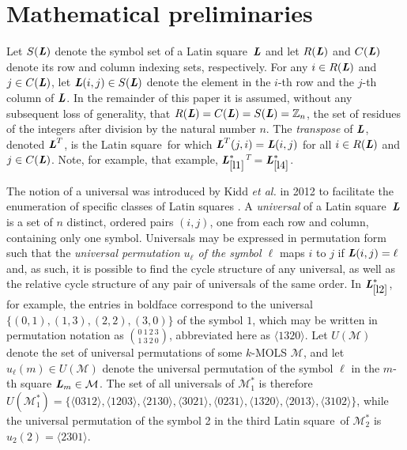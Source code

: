 \documentclass[11pt, a4paper]{article}
\newcommand{\lat}{Latin square}
\renewcommand{\l}{ \mbox{\bf \emph{L}} }
\newcommand{\m}{\mathcal{ M}}
\newcommand{\lref}[1]{$\l_{\ref{#1}}^*$}
\newcounter{ls}
\begin{document}
\section{Mathematical preliminaries}

Let $S(\l)$ denote the symbol set of a \lat \ $\l$ and let $R(\l)$ and $ C(\l)$ denote its row and column indexing sets, respectively.   For any $i \in R(\l)$ and $j \in C(\l)$, let $\l(i,j) \in S(\l)$   denote the element in the $i$-th row and the $j$-th column of $\l$. In the remainder of this paper it is assumed, without any subsequent loss of generality, that  $R(\l)= C(\l)=S(\l) = \mathbb{Z}_n$, the set of residues of the integers after division by the natural number $n$. The \emph{transpose} of $\l$, denoted $\l^T$, is the \lat \ for which $\l^T(j,i) = \l(i,j)$ for all $i\in R(\l)$ and $j\in C(\l)$. Note, for example, that example, \lref{l1}$^T =$\lref{l4}.%



The notion of a universal was introduced by Kidd \emph{et al.} \cite{Kidd2012} in 2012 to facilitate the enumeration of specific classes of \lat s . A \emph{universal}  of a \lat \ $\l$ is a set of $n$ distinct, ordered pairs $(i,j)$, one from each row and column, containing only one symbol. Universals may be expressed in permutation form such that the \emph{universal permutation $u_{\ell}$ of the symbol $\ell$} maps $ i $ to $j $ if $\l(i,j) = \ell$ and, as such, it is possible to find the cycle structure of any universal, as well as the relative cycle structure of any pair of universals of the same order. In \lref{l2}, for example,  the entries in boldface correspond to the universal $\{(0,1), (1,3), (2, 2), (3, 0)\}$ of the symbol $1$, which may be written in permutation notation as $\binom{0\ 1\ 2\ 3}{1\ 3\ 2\ 0}$, abbreviated here as $\langle1320\rangle$. Let $U(\m)$ denote the set of universal permutations of some $k$-MOLS $\m$, and let $u_{\ell}(m)\in U(\m)$ denote the universal permutation of the symbol $\ell$ in the $m$-th square $\l_m \in \m$. The set of all universals of $\m_1^*$ is therefore $U(\m_1^*) = \{\langle 0312 \rangle, \langle 1203 \rangle, \langle 2130 \rangle, \langle 3021 \rangle,\langle 0231 \rangle,\langle 1320 \rangle, \langle 2013 \rangle, \langle 3102 \rangle \}$, while the universal permutation of the symbol 2 in the third \lat \ of $\m_2^*$ is $u_2{(2)} = \langle 2301 \rangle$.
\end{document}
